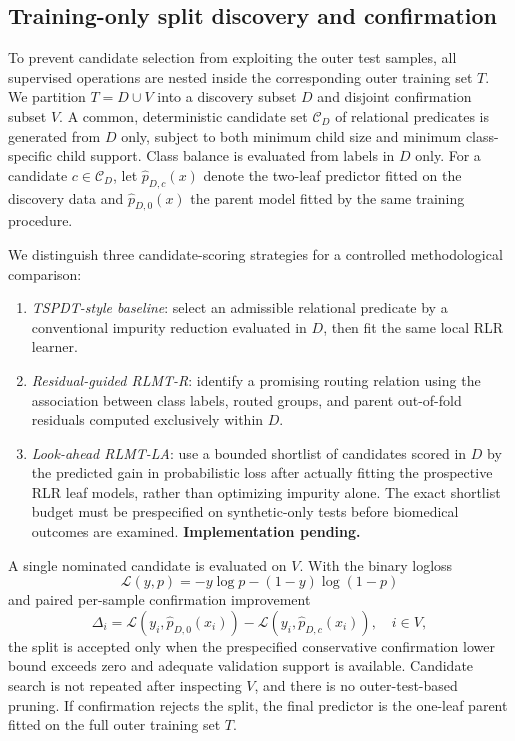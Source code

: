 \subsection{Training-only split discovery and confirmation}
\label{sec:rlmt_discovery}

To prevent candidate selection from exploiting the outer test
samples, all supervised operations are nested inside the
corresponding outer training set $T$.  We partition
$T=D\cup V$ into a discovery subset $D$ and disjoint
confirmation subset $V$. A common, deterministic candidate
set $\mathcal C_D$ of relational predicates is generated from
$D$ only, subject to both minimum child size and minimum
class-specific child support. Class balance is evaluated from
labels in $D$ only. For a candidate $c\in\mathcal C_D$,
let $\widehat{p}_{D,c}(x)$ denote the two-leaf predictor fitted
on the discovery data and $\widehat{p}_{D,0}(x)$ the parent
model fitted by the same training procedure.

We distinguish three candidate-scoring strategies for a
controlled methodological comparison:
\begin{enumerate}
  \item \textit{TSPDT-style baseline}: select an admissible
  relational predicate by a conventional impurity reduction
  evaluated in $D$, then fit the same local RLR learner.
  \item \textit{Residual-guided RLMT-R}: identify a
  promising routing relation using the association between
  class labels, routed groups, and parent out-of-fold
  residuals computed exclusively within $D$.
  \item \textit{Look-ahead RLMT-LA}: use a bounded shortlist
  of candidates scored in $D$ by the predicted gain in
  probabilistic loss after actually fitting the prospective
  RLR leaf models, rather than optimizing impurity alone.
  The exact shortlist budget must be prespecified on
  synthetic-only tests before biomedical outcomes are
  examined. \textbf{Implementation pending.}
\end{enumerate}

A single nominated candidate is evaluated on $V$. With the
binary logloss
\begin{equation}
  \mathcal L(y,p)=-y\log p-(1-y)\log(1-p)
  \label{eq:rlmt_logloss}
\end{equation}
and paired per-sample confirmation improvement
\begin{equation}
  \Delta_i=
  \mathcal L(y_i,\widehat p_{D,0}(x_i))
  -
  \mathcal L(y_i,\widehat p_{D,c}(x_i)),
  \quad i\in V ,
  \label{eq:rlmt_paired_delta}
\end{equation}
the split is accepted only when the prespecified conservative
confirmation lower bound exceeds zero and adequate validation
support is available.  Candidate search is not repeated after
inspecting $V$, and there is no outer-test-based pruning.
If confirmation rejects the split, the final predictor is the
one-leaf parent fitted on the full outer training set $T$.

